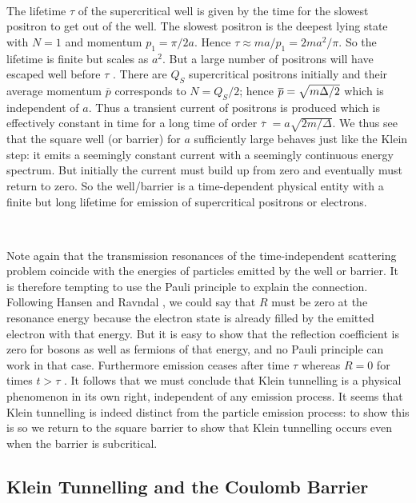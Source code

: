 \smallskip\ 

\noindent The lifetime $\tau $ of the supercritical well is given by the
time for the slowest positron to get out of the well. The slowest positron
is the deepest lying state with $N=1$ and momentum $p_1=\pi /2a$. Hence $%
\tau \approx ma/p_1=2ma^2/\pi .$ So the lifetime is finite but scales as $%
a^2 $. But a large number of positrons will have escaped well before $\tau $%
. There are $Q_S$ supercritical positrons initially and their average
momentum $\overline{p}$ corresponds to $N=Q_S/2$; hence $\overline{p}=\sqrt{%
m\Delta /2}$ which is independent of $a$. Thus a transient current of
positrons is produced which is effectively constant in time for a long time
of order $\overline{\tau }$ $=a\sqrt{2m/\Delta }$. We thus see that the
square well (or barrier) for $a$ sufficiently large behaves just like the
Klein step: it emits a seemingly constant current with a seemingly
continuous energy spectrum. But initially the current must build up from
zero and eventually must return to zero. So the well/barrier is a
time-dependent physical entity with a finite but long lifetime for emission
of supercritical positrons or electrons.

\smallskip\ 

\noindent Note again that the transmission resonances of the
time-independent scattering problem coincide with the energies of particles
emitted by the well or barrier. It is therefore tempting to use the Pauli
principle to explain the connection. Following Hansen and Ravndal \cite{hans}%
, we could say that $R$ must be zero at the resonance energy because the
electron state is already filled by the emitted electron with that energy.
But it is easy to show that the reflection coefficient is zero for bosons as
well as fermions of that energy, and no Pauli principle can work in that
case. Furthermore emission ceases after time $\tau $ whereas $R=0$ for times 
$t>\tau $ . It follows that we must conclude that Klein tunnelling is a
physical phenomenon in its own right, independent of any emission process.
It seems that Klein tunnelling is indeed distinct from the particle emission
process: to show this is so we return to the square barrier to show that
Klein tunnelling occurs even when the barrier is subcritical.

\subsection{Klein Tunnelling and the Coulomb Barrier}


